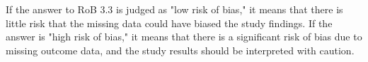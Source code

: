\documentclass[sn-mathphys,Numbered]{sn-jnl}%
\begin{document}
If the answer to RoB 3.3 is judged as "low risk of bias," it means that there is little risk that the missing data could have biased the study findings. If the answer is "high risk of bias," it means that there is a significant risk of bias due to missing outcome data, and the study results should be interpreted with caution.
%
%
%

\end{document}

